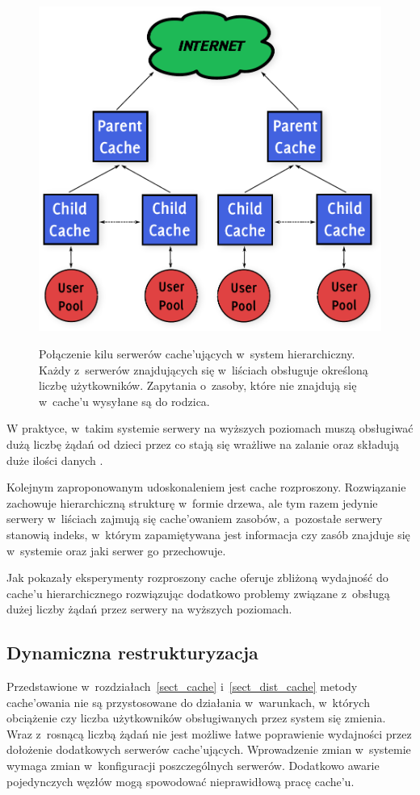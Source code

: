 \documentclass[a4paper,11pt]{scrartcl}
\newcommand{\s}{ }
\newcommand{\kesz}{cache}
\newcommand{\keszu}{cache'u}
\newcommand{\keszujacych}{cache'ujących}
\newcommand{\keszowania}{cache'owania}
\newcommand{\keszowaniem}{cache'owaniem}
\begin{document}
\begin{figure}[h]
\centering
\includegraphics[width=0.8\linewidth]{img/hierarchical.pdf}
\label{fig_cache_hierarchical}
\caption{Połączenie kilu serwerów \keszujacych\s w~system hierarchiczny. Każdy z~serwerów znajdujących się w~liściach obsługuje określoną liczbę użytkowników. Zapytania o~zasoby, które nie znajdują się w~\keszu\s wysyłane są do rodzica.}
\end{figure}

W praktyce, w~takim systemie serwery na wyższych poziomach muszą obsługiwać dużą liczbę żądań od dzieci przez co stają się wrażliwe na zalanie oraz składują duże ilości danych \cite{povey1997distributed}.

Kolejnym zaproponowanym udoskonaleniem jest \kesz\s rozproszony. Rozwiązanie zachowuje hierarchiczną strukturę w~formie drzewa, ale tym razem jedynie serwery w~liściach zajmują się \keszowaniem\s zasobów, a~pozostałe serwery stanowią indeks, w~którym zapamiętywana jest informacja czy zasób znajduje się w~systemie oraz jaki serwer go przechowuje.

Jak pokazały eksperymenty \cite{povey1997distributed} rozproszony \kesz\s oferuje zbliżoną wydajność do \keszu\s hierarchicznego rozwiązując dodatkowo problemy związane z~obsługą dużej liczby żądań przez serwery na wyższych poziomach.

\subsection{Dynamiczna restrukturyzacja}
Przedstawione w~rozdziałach~\ref{sect_cache} i~\ref{sect_dist_cache} metody \keszowania\s nie są przystosowane do działania w~warunkach, w~których obciążenie czy liczba użytkowników obsługiwanych przez system się zmienia. Wraz z~rosnącą liczbą żądań nie jest możliwe łatwe poprawienie wydajności przez dołożenie dodatkowych serwerów \keszujacych. Wprowadzenie zmian w~systemie wymaga zmian w~konfiguracji poszczególnych serwerów. Dodatkowo awarie pojedynczych węzłów mogą spowodować nieprawidłową pracę \keszu.
\end{document}
